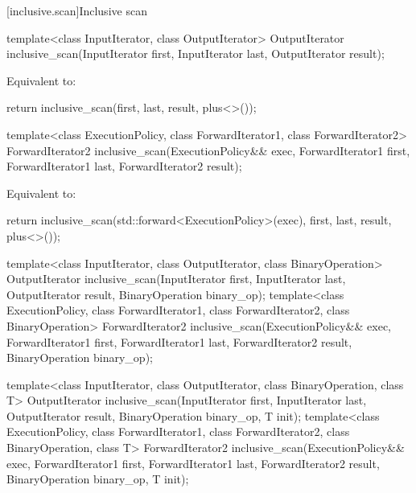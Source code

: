 [inclusive.scan]{Inclusive scan}

%
\begin{itemdecl}
template<class InputIterator, class OutputIterator>
  OutputIterator inclusive_scan(InputIterator first, InputIterator last,
                                OutputIterator result);
\end{itemdecl}

\begin{itemdescr}
\pnum
\effects Equivalent to:
\begin{codeblock}
return inclusive_scan(first, last, result, plus<>());
\end{codeblock}
\end{itemdescr}

%
\begin{itemdecl}
template<class ExecutionPolicy, class ForwardIterator1, class ForwardIterator2>
  ForwardIterator2 inclusive_scan(ExecutionPolicy&& exec,
                                ForwardIterator1 first, ForwardIterator1 last,
                                ForwardIterator2 result);
\end{itemdecl}

\begin{itemdescr}
\pnum
\effects Equivalent to:
\begin{codeblock}
return inclusive_scan(std::forward<ExecutionPolicy>(exec), first, last, result, plus<>());
\end{codeblock}
\end{itemdescr}


%
\begin{itemdecl}
template<class InputIterator, class OutputIterator, class BinaryOperation>
  OutputIterator inclusive_scan(InputIterator first, InputIterator last,
                                OutputIterator result,
                                BinaryOperation binary_op);
template<class ExecutionPolicy, class ForwardIterator1, class ForwardIterator2, class BinaryOperation>
  ForwardIterator2 inclusive_scan(ExecutionPolicy&& exec,
                                  ForwardIterator1 first, ForwardIterator1 last,
                                  ForwardIterator2 result,
                                  BinaryOperation binary_op);

template<class InputIterator, class OutputIterator, class BinaryOperation, class T>
  OutputIterator inclusive_scan(InputIterator first, InputIterator last,
                                OutputIterator result,
                                BinaryOperation binary_op, T init);
template<class ExecutionPolicy,
         class ForwardIterator1, class ForwardIterator2, class BinaryOperation, class T>
  ForwardIterator2 inclusive_scan(ExecutionPolicy&& exec,
                                  ForwardIterator1 first, ForwardIterator1 last,
                                  ForwardIterator2 result,
                                  BinaryOperation binary_op, T init);
\end{itemdecl}

